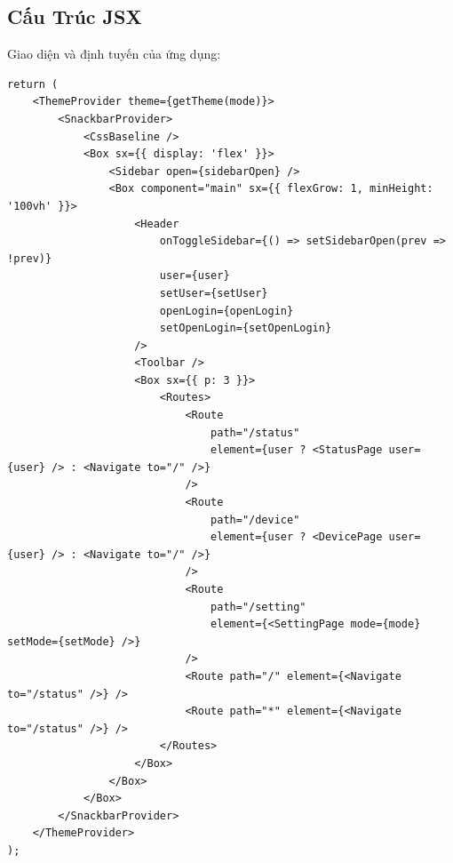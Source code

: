         \subsection{Cấu Trúc JSX}
            \hspace*{0.6cm}Giao diện và định tuyến của ứng dụng:
            \begin{lstlisting}
return (
    <ThemeProvider theme={getTheme(mode)}>
        <SnackbarProvider>
            <CssBaseline />
            <Box sx={{ display: 'flex' }}>
                <Sidebar open={sidebarOpen} />
                <Box component="main" sx={{ flexGrow: 1, minHeight: '100vh' }}>
                    <Header
                        onToggleSidebar={() => setSidebarOpen(prev => !prev)}
                        user={user}
                        setUser={setUser}
                        openLogin={openLogin}
                        setOpenLogin={setOpenLogin}
                    />
                    <Toolbar />
                    <Box sx={{ p: 3 }}>
                        <Routes>
                            <Route
                                path="/status"
                                element={user ? <StatusPage user={user} /> : <Navigate to="/" />}
                            />
                            <Route
                                path="/device"
                                element={user ? <DevicePage user={user} /> : <Navigate to="/" />}
                            />
                            <Route
                                path="/setting"
                                element={<SettingPage mode={mode} setMode={setMode} />}
                            />
                            <Route path="/" element={<Navigate to="/status" />} />
                            <Route path="*" element={<Navigate to="/status" />} />
                        </Routes>
                    </Box>
                </Box>
            </Box>
        </SnackbarProvider>
    </ThemeProvider>
);
            \end{lstlisting}

